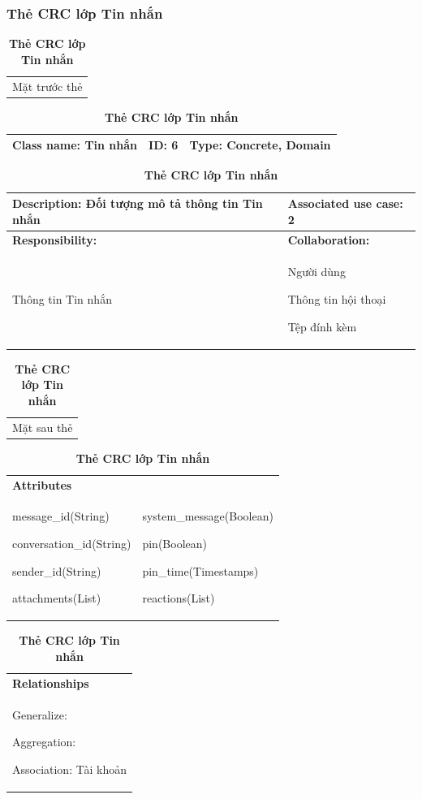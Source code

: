   \subsubsection{Thẻ CRC lớp Tin nhắn}
  \begin{table}[H]
    \caption{\bfseries \fontsize{12pt}{0pt}\selectfont Thẻ CRC lớp Tin nhắn}
    \centering
    \begin{tabularx}{0.9\textwidth}{X}
      Mặt trước thẻ
    \end{tabularx}
    \begin{tabularx}{0.9\textwidth}{|X|X|X|}
      \hline
      \textbf{Class name:} Tin nhắn & \textbf{ID:} 6 & \textbf{Type:} Concrete, Domain \\
      \hline
    \end{tabularx}
    \begin{tabularx}{0.9\textwidth}{|X|X|}
      \textbf{Description:} Đối tượng mô tả thông tin Tin nhắn & \textbf{Associated use case:} 2 \\
      \hline
      \textbf{Responsibility:} & \textbf{Collaboration:} \\
      Thông tin Tin nhắn
      & 
      Người dùng

      Thông tin hội thoại 

      Tệp đính kèm
      \\
      \hline
    \end{tabularx}
    \begin{tabularx}{0.9\textwidth}{X}
      Mặt sau thẻ
    \end{tabularx}
    \begin{tabularx}{0.9\textwidth}{|X|X|}
      \hline
      \textbf{Attributes} & \\
      message\_id(String) 
      
      conversation\_id(String)

      sender\_id(String)

      attachments(List)
      &
      system\_message(Boolean)

      pin(Boolean)

      pin\_time(Timestamps)

      reactions(List)
      \\
      \hline
    \end{tabularx}
    \begin{tabularx}{0.9\textwidth}{|X|}
      \textbf{Relationships} \\
      Generalize:  

      Aggregation:  
      
      Association: Tài khoản 
      \\
      \hline
    \end{tabularx}
  \end{table}

